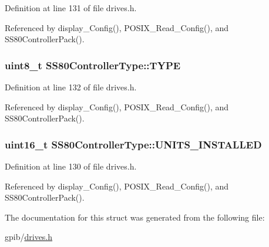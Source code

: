 Definition at line 131 of file drives.\+h.



Referenced by display\+\_\+\+Config(), P\+O\+S\+I\+X\+\_\+\+Read\+\_\+\+Config(), and S\+S80\+Controller\+Pack().

\subsubsection[{\texorpdfstring{T\+Y\+PE}{TYPE}}]{\setlength{\rightskip}{0pt plus 5cm}uint8\+\_\+t S\+S80\+Controller\+Type\+::\+T\+Y\+PE}\hypertarget{structSS80ControllerType_a255739680bca0ad3b4d1346cf5017332}{}\label{structSS80ControllerType_a255739680bca0ad3b4d1346cf5017332}


Definition at line 132 of file drives.\+h.



Referenced by display\+\_\+\+Config(), P\+O\+S\+I\+X\+\_\+\+Read\+\_\+\+Config(), and S\+S80\+Controller\+Pack().

\subsubsection[{\texorpdfstring{U\+N\+I\+T\+S\+\_\+\+I\+N\+S\+T\+A\+L\+L\+ED}{UNITS_INSTALLED}}]{\setlength{\rightskip}{0pt plus 5cm}uint16\+\_\+t S\+S80\+Controller\+Type\+::\+U\+N\+I\+T\+S\+\_\+\+I\+N\+S\+T\+A\+L\+L\+ED}\hypertarget{structSS80ControllerType_a0868c32b362ef2af2ac64fa16aee8aae}{}\label{structSS80ControllerType_a0868c32b362ef2af2ac64fa16aee8aae}


Definition at line 130 of file drives.\+h.



Referenced by display\+\_\+\+Config(), P\+O\+S\+I\+X\+\_\+\+Read\+\_\+\+Config(), and S\+S80\+Controller\+Pack().



The documentation for this struct was generated from the following file\+:\begin{DoxyCompactItemize}
\item 
gpib/\hyperlink{drives_8h}{drives.\+h}\end{DoxyCompactItemize}
